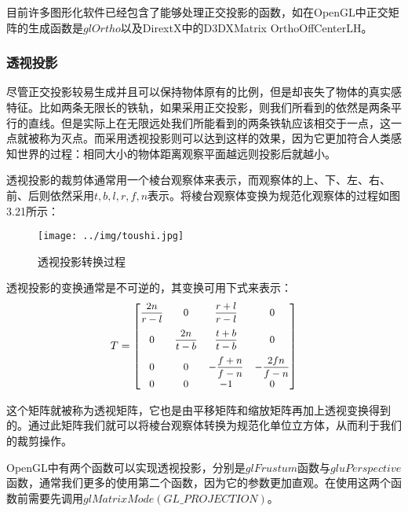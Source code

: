 目前许多图形化软件已经包含了能够处理正交投影的函数，如在OpenGL中正交矩阵的生成函数是$glOrtho$以及DirextX中的D3DXMatrix
OrthoOffCenterLH。

\subsubsection{透视投影}
尽管正交投影较易生成并且可以保持物体原有的比例，但是却丧失了物体的真实感特征。比如两条无限长的铁轨，如果采用正交投影，则我们所看到的依然是两条平行的直线。但是实际上在无限远处我们所能看到的两条铁轨应该相交于一点，这一点就被称为灭点。而采用透视投影则可以达到这样的效果，因为它更加符合人类感知世界的过程：相同大小的物体距离观察平面越远则投影后就越小。

透视投影的裁剪体通常用一个棱台观察体来表示，而观察体的上、下、左、右、前、后则依然采用$t,b,l,r,f,n$表示。将棱台观察体变换为规范化观察体的过程如图3.21所示：
\begin{figure}[htb]
\centering
\texttt{[image: ../img/toushi.jpg]}
\caption{透视投影转换过程}
\label{fig：graph}
\end{figure} 

透视投影的变换通常是不可逆的，其变换可用下式来表示：
\begin{eqnarray}       %
T = 
\begin{small}
\begin{bmatrix}
\vspace{0.2cm}
    \displaystyle\frac{2n}{r-l} & 0 & \displaystyle\frac{r+l}{r-l} & 0\\  %
\vspace{0.2cm}
    0 & \displaystyle\frac{2n}{t-b} & \displaystyle\frac{t+b}{t-b} & 0\\  %
	0 & 0 & \displaystyle-\frac{f+n}{f-n} & \displaystyle-\frac{2fn}{f-n}\\  %
    0 & 0 & -1 & 0\\%
\end{bmatrix} 
\end{small}
\end{eqnarray}

这个矩阵就被称为透视矩阵，它也是由平移矩阵和缩放矩阵再加上透视变换得到的。通过此矩阵我们就可以将棱台观察体转换为规范化单位立方体，从而利于我们的裁剪操作。

OpenGL中有两个函数可以实现透视投影，分别是$glFrustum$函数与$gluPerspective$函数，通常我们更多的使用第二个函数，因为它的参数更加直观。在使用这两个函数前需要先调用$glMatrixMode(GL\_PROJECTION)$。

